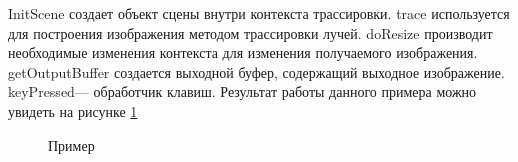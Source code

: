 InitScene создает объект сцены внутри контекста трассировки. 
 trace используется для построения изображения методом трассировки лучей.
 doResize производит необходимые изменения контекста для изменения получаемого изображения.
 getOutputBuffer создается выходной буфер, содержащий выходное изображение.
  keyPressed--- обработчик клавиш.
  Результат работы данного примера можно увидеть на рисунке \ref{glass}
\begin{figure}[h!]
\caption{\small{Пример}}
\label{glass}
\end{figure}
 